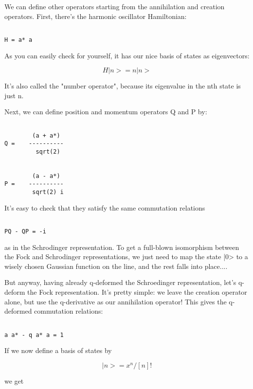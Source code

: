 We can define other operators starting from the annihilation and
creation operators.  First, there's the harmonic oscillator Hamiltonian:


\begin{verbatim}

H = a* a
\end{verbatim}
    
As you can easily check for yourself, it has our nice basis of states 
as eigenvectors:


$$

H|n> = n |n>
$$
    
It's also called the "number operator", because its eigenvalue in the
nth state is just n.

Next, we can define position and momentum operators Q and P by:
      

\begin{verbatim}

        (a + a*) 
Q =    ----------
         sqrt(2)


        (a - a*) 
P =    ----------
        sqrt(2) i
\end{verbatim}
    
It's easy to check that they satisfy the same commutation relations


\begin{verbatim}

PQ - QP = -i
\end{verbatim}
    
as in the Schrodinger representation.  To get a full-blown isomorphism
between the Fock and Schrodinger representations, we just need to map
the state |0> to a wisely chosen Gaussian function on the line, and
the rest falls into place....

But anyway, having already q-deformed the Schroedinger representation,
let's q-deform the Fock representation.  It's pretty simple: we leave
the creation operator alone, but use the q-derivative as our annihilation
operator!  This gives the q-deformed commutation relations:


\begin{verbatim}

a a* - q a* a = 1
\end{verbatim}
    
If we now define a basis of states by 


$$

|n> = x^{n} / [n]!
$$
    
we get 

$$

